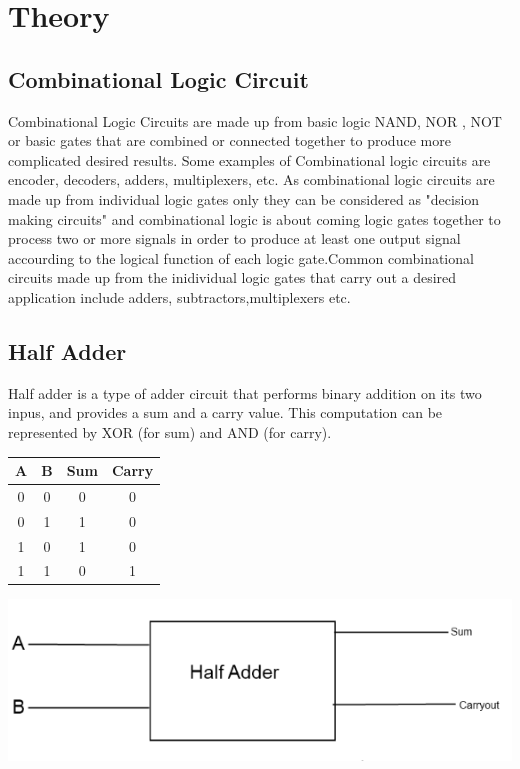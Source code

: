 \documentclass[a4paper, 12pt]{article}
\begin{document}
\section{Theory}
\subsection{Combinational Logic Circuit}
Combinational Logic Circuits are made up from basic logic NAND,
 NOR , NOT or basic gates that are combined or 
connected together to produce more complicated desired results. Some
 examples of Combinational logic circuits are encoder,
decoders, adders, multiplexers, etc.
As combinational logic circuits are made up from individual logic gates only
they can be considered as "decision making circuits" and combinational logic
is about coming logic gates together to process two or more signals in 
order to produce at least one output signal accourding to the logical function
of each logic gate.Common combinational circuits made up from the inidividual 
logic gates that carry out a desired application include adders, subtractors,multiplexers etc.

\pagebreak

\subsection{Half Adder}

Half adder is a type of adder circuit that performs 
binary addition on
its two inpus, and provides a sum and a carry value. This computation 
can be represented by XOR (for sum) and AND (for carry). \\

\begin{minipage}[c]{0.3\textwidth}
	\begin{center}
	\begin{tabular}[h]{|c|c|c|c|}
	\hline
	A & B & Sum & Carry \\
	\hline
	0 & 0 & 0 & 0 \\
	0 & 1 & 1 & 0 \\
	1 & 0 & 1 & 0 \\
	1 & 1 & 0 & 1 \\
	\hline
	\end{tabular}
	\end{center}
\end{minipage}
\begin{minipage}[c]{0.65\textwidth}
	\centering
	\includegraphics[scale=0.5]{half-adder-block.png}
\end{minipage}
\end{document}
